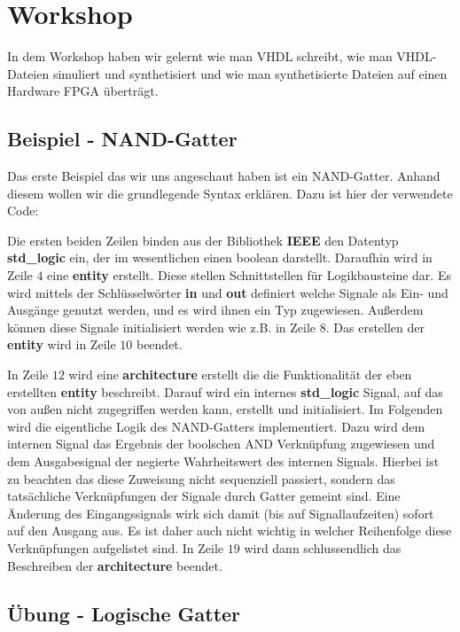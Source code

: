 \section{Workshop}
In dem Workshop haben wir gelernt wie man VHDL schreibt, wie man VHDL-Dateien simuliert und synthetisiert und wie man synthetisierte Dateien auf einen Hardware FPGA überträgt.

\subsection{Beispiel - NAND-Gatter}
Das erste Beispiel das wir uns angeschaut haben ist ein NAND-Gatter.
Anhand diesem wollen wir die grundlegende Syntax erklären.
Dazu ist hier der verwendete Code:



Die ersten beiden Zeilen binden aus der Bibliothek \textbf{IEEE} den Datentyp \textbf{std\_logic} ein, der im wesentlichen einen boolean darstellt.
Daraufhin wird in Zeile $4$ eine \textbf{entity} erstellt.
Diese stellen Schnittstellen für Logikbausteine dar.
Es wird mittels der Schlüsselwörter \textbf{in} und \textbf{out} definiert welche Signale als Ein- und Ausgänge genutzt werden, und es wird ihnen ein Typ zugewiesen.
Außerdem können diese Signale initialisiert werden wie z.B. in Zeile $8$.
Das erstellen der \textbf{entity} wird in Zeile $10$ beendet.

In Zeile $12$ wird eine \textbf{architecture} erstellt die die Funktionalität der eben erstellten \textbf{entity} beschreibt.
Darauf wird ein internes \textbf{std\_logic} Signal, auf das von außen nicht zugegriffen werden kann, erstellt und initialisiert.
Im Folgenden wird die eigentliche Logik des NAND-Gatters implementiert.
Dazu wird dem internen Signal das Ergebnis der boolschen AND Verknüpfung zugewiesen und dem Ausgabesignal der negierte Wahrheitswert des internen Signals.
Hierbei ist zu beachten das diese Zuweisung nicht sequenziell passiert, sondern das tatsächliche Verknüpfungen der Signale durch Gatter gemeint sind.
Eine Änderung des Eingangssignals wirk sich damit (bis auf Signallaufzeiten) sofort auf den Ausgang aus.
Es ist daher auch nicht wichtig in welcher Reihenfolge diese Verknüpfungen aufgelistet sind.
In Zeile $19$ wird dann schlussendlich das Beschreiben der \textbf{architecture} beendet.

\subsection{Übung - Logische Gatter}

